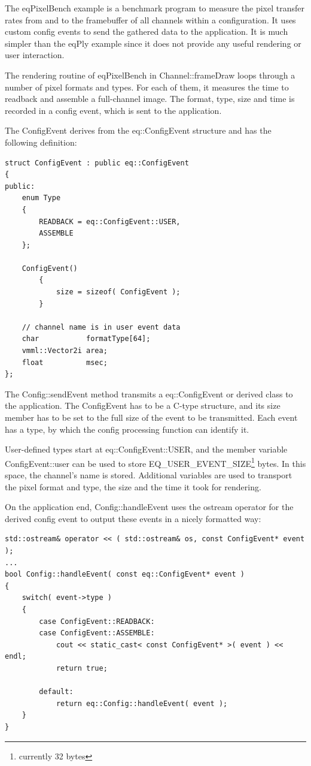 \documentclass[10pt,a4]{scrartcl}
\begin{document}
The \textsf{eqPixelBench} example is a benchmark program to measure the
pixel transfer rates from and to the framebuffer of all channels within
a configuration. It uses custom config events to send the gathered data
to the application. It is much simpler than the \textsf{eqPly} example
since it does not provide any useful rendering or user interaction.

The rendering routine of \textsf{eqPixelBench} in
\textsf{Channel::frameDraw} loops through a number of pixel formats and
types. For each of them, it measures the time to readback and assemble a
full-channel image. The format, type, size and time is recorded in a
config event, which is sent to the application.

The \textsf{ConfigEvent} derives from the \textsf{eq::ConfigEvent}
structure and has the following definition:

{\footnotesize\begin{lstlisting}
struct ConfigEvent : public eq::ConfigEvent
{
public:
    enum Type
    {
        READBACK = eq::ConfigEvent::USER,
        ASSEMBLE
    };

    ConfigEvent()
        {
            size = sizeof( ConfigEvent );
        }

    // channel name is in user event data
    char           formatType[64];
    vmml::Vector2i area;
    float          msec;
};
\end{lstlisting}}

The \textsf{Config::sendEvent} method transmits a
\textsf{eq::ConfigEvent} or derived class to the application. The
ConfigEvent has to be a C-type structure, and its \textsf{size}
member has to be set to the full size of the event to be transmitted.
Each event has a type, by which the config processing function can
identify it. 

User-defined types start at \textsf{eq::ConfigEvent::USER}, and the
member variable \textsf{ConfigEvent::user} can be used to store
\textsf{EQ\_USER\_EVENT\_SIZE}\footnote{currently 32 bytes} bytes. In
this space, the channel's name is stored. Additional variables are used
to transport the pixel format and type, the size and the time it took
for rendering.

On the application end, \textsf{Config::handleEvent} uses the ostream
operator for the derived config event to output these events in a nicely
formatted way:

{\footnotesize\begin{lstlisting}
std::ostream& operator << ( std::ostream& os, const ConfigEvent* event );
...
bool Config::handleEvent( const eq::ConfigEvent* event )
{
    switch( event->type )
    {
        case ConfigEvent::READBACK:
        case ConfigEvent::ASSEMBLE:
            cout << static_cast< const ConfigEvent* >( event ) << endl;
            return true;

        default:
            return eq::Config::handleEvent( event );
    }
}
\end{lstlisting}}%
\end{document}
